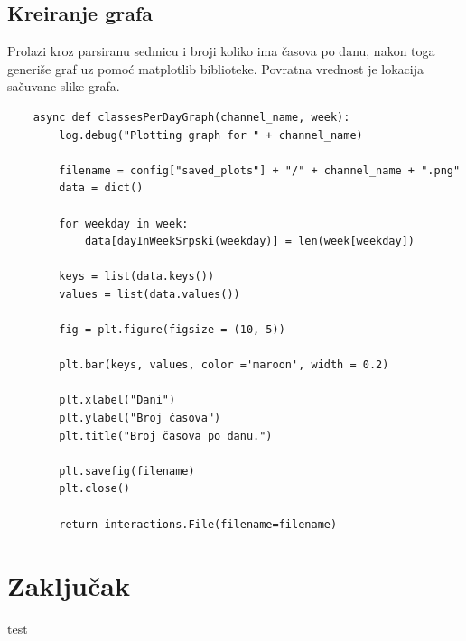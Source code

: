 \documentclass[a4paper,11pt]{article}
\begin{document}
\subsection{Kreiranje grafa}
Prolazi kroz parsiranu sedmicu i broji koliko ima časova po danu, nakon toga generiše graf uz pomoć matplotlib\cite{matplotlib} biblioteke. Povratna vrednost je lokacija sačuvane slike grafa.
\begin{verbatim}
    async def classesPerDayGraph(channel_name, week):
        log.debug("Plotting graph for " + channel_name)

        filename = config["saved_plots"] + "/" + channel_name + ".png"
        data = dict()

        for weekday in week:
            data[dayInWeekSrpski(weekday)] = len(week[weekday])

        keys = list(data.keys())
        values = list(data.values())

        fig = plt.figure(figsize = (10, 5))

        plt.bar(keys, values, color ='maroon', width = 0.2)

        plt.xlabel("Dani")
        plt.ylabel("Broj časova")
        plt.title("Broj časova po danu.")

        plt.savefig(filename)
        plt.close()

        return interactions.File(filename=filename)
\end{verbatim}
\newpage
\section{Zaključak}
test
\newpage

\pagestyle{plain}
\renewcommand\refname{Literatura}


\end{document}
